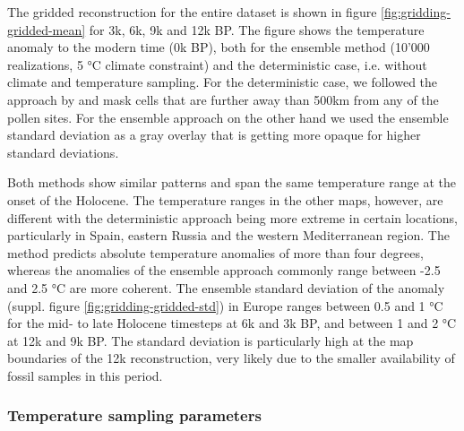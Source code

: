 \documentclass[
11pt, %
english, %
singlespacing, %
headsepline, %
]{MastersDoctoralThesis} %
\begin{document}
\begin{NoHyper}
\begin{refsection}
The gridded reconstruction for the entire dataset is shown in figure \ref{fig:gridding-gridded-mean} for 3k, 6k, 9k and 12k BP. The figure shows the temperature anomaly to the modern time (0k BP), both for the ensemble method (10'000 realizations, 5 °C climate constraint) and the deterministic case, i.e. without climate and temperature sampling. For the deterministic case, we followed the approach by \cite{MauriDavisCollinsEtAl2015} and mask cells that are further away than 500km from any of the pollen sites. For the ensemble approach on the other hand we used the ensemble standard deviation as a gray overlay that is getting more opaque for higher standard deviations.

Both methods show similar patterns and span the same temperature range at the onset of the Holocene. The temperature ranges in the other maps, however, are different with the deterministic approach being more extreme in certain locations, particularly in Spain, eastern Russia and the western Mediterranean region. The method predicts absolute temperature anomalies of more than four degrees, whereas the anomalies of the ensemble approach commonly range between -2.5 and 2.5 °C are more coherent. The ensemble standard deviation of the anomaly (suppl. figure \ref{fig:gridding-gridded-std}) in Europe ranges between 0.5 and 1 °C for the mid- to late Holocene timesteps at 6k and 3k BP, and between 1 and 2 °C at 12k and 9k BP. The standard deviation is particularly high at the map boundaries of the 12k reconstruction, very likely due to the smaller availability of fossil samples in this period.


\subsubsection{Temperature sampling parameters}


\end{refsection}
\end{NoHyper}
\end{document}
